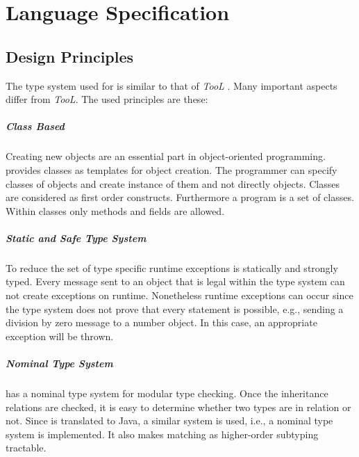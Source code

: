 \chapter{Language Specification}


\section{Design Principles}
The type system used for \ooplss is similar to that of \emph{TooL}
\cite{gawecki_tool:_1995}. Many important aspects differ from
\emph{TooL}. The used principles are these:


\paragraph{Class Based}
Creating new objects are an essential part in object-oriented
programming. \ooplss provides classes as templates for object
creation. The programmer can specify classes of objects and create
instance of them and not directly objects. Classes are considered as
first order constructs. Furthermore a program is a set of classes. Within
classes only methods and fields are allowed.

\paragraph{Static and Safe Type System}
To reduce the set of type specific runtime exceptions \ooplss is statically
and strongly typed. Every message sent to an object that is legal within
the type system can not create exceptions on runtime. Nonetheless runtime
exceptions can occur since the type system does not prove that every
statement is possible, e.g., sending a division by zero message to a
number object.  In this case, an appropriate exception will be thrown.

\paragraph{Nominal Type System}
\ooplss has a nominal type system for modular type checking. Once the
inheritance relations are checked, it is easy to determine whether
two types are in relation or not. Since \ooplss is translated to Java,
a similar system is used, i.e., a nominal type system is implemented.
It also makes matching as higher-order subtyping tractable.

